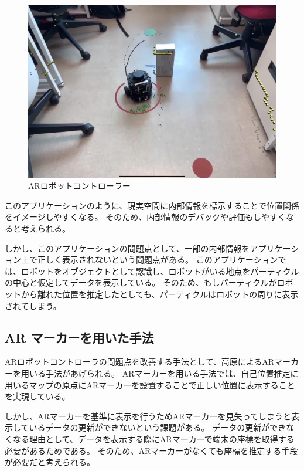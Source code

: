 \begin{figure}[H]
	\begin{center}
		\includegraphics[width=1.0\linewidth]{figs/ARsuzuki.png}
		\caption{ARロボットコントローラー}
		\label{ARロボットコントローラー}
	\end{center}
\end{figure}

このアプリケーションのように、現実空間に内部情報を標示することで位置関係をイメージしやすくなる。
そのため、内部情報のデバックや評価もしやすくなると考えられる。

しかし、このアプリケーションの問題点として、一部の内部情報をアプリケーション上で正しく表示されないという問題点がある。
このアプリケーションでは、ロボットをオブジェクトとして認識し、ロボットがいる地点をパーティクルの中心と仮定してデータを表示している。
そのため、もしパーティクルがロボットから離れた位置を推定したとしても、パーティクルはロボットの周りに表示されてしまう。


\subsection{AR マーカーを用いた手法}

ARロボットコントローラの問題点を改善する手法として、高原によるARマーカーを用いる手法\cite{高原一樹2021ロボットの自己位置推定を可視化するAugmentedRealityアプリケーション}があげられる。
ARマーカーを用いる手法では、自己位置推定に用いるマップの原点にARマーカーを設置することで正しい位置に表示することを実現している。

しかし、ARマーカーを基準に表示を行うためARマーカーを見失ってしまうと表示しているデータの更新ができないという課題がある。
データの更新ができなくなる理由として、データを表示する際にARマーカーで端末の座標を取得する必要があるためである。
そのため、ARマーカーがなくても座標を推定する手段が必要だと考えられる。


